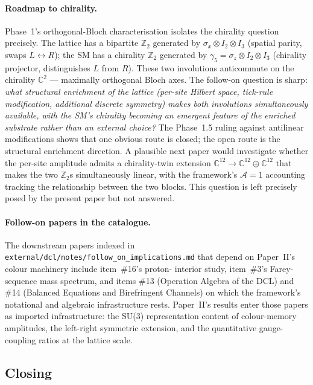 \paragraph{Roadmap to chirality.}  Phase~1's orthogonal-Bloch
characterisation isolates the chirality question precisely.  The
lattice has a bipartite $\mathbb{Z}_2$ generated by $\sigma_x
\otimes I_2 \otimes I_3$ (spatial parity, swaps $L \leftrightarrow
R$); the SM has a chirality $\mathbb{Z}_2$ generated by $\gamma_5
= \sigma_z \otimes I_2 \otimes I_3$ (chirality projector,
distinguishes $L$ from $R$).  These two involutions anticommute
on the chirality $\mathbb{C}^2$ --- maximally orthogonal Bloch
axes.  The follow-on question is sharp: \emph{what structural
enrichment of the lattice (per-site Hilbert space, tick-rule
modification, additional discrete symmetry) makes both
involutions simultaneously available, with the SM's chirality
becoming an emergent feature of the enriched substrate rather
than an external choice?}  The Phase~1.5 ruling against
antilinear modifications shows that one obvious route is closed;
the open route is the structural enrichment direction.  A
plausible next paper would investigate whether the per-site
amplitude admits a chirality-twin extension
$\mathbb{C}^{12} \to \mathbb{C}^{12} \oplus \mathbb{C}^{12}$ that
makes the two $\mathbb{Z}_2$s simultaneously linear, with the
framework's $\mathcal{A}=1$ accounting tracking the relationship
between the two blocks.  This question is left precisely posed
by the present paper but not answered.

\paragraph{Follow-on papers in the catalogue.}  The downstream
papers indexed in
\nolinkurl{external/dcl/notes/follow_on_implications.md} that depend
on Paper~II's colour machinery include item~\#16's proton-
interior study, item~\#3's Farey-sequence mass spectrum, and
items \#13 (Operation Algebra of the DCL) and \#14 (Balanced
Equations and Birefringent Channels) on which the framework's
notational and algebraic infrastructure rests.  Paper~II's
results enter those papers as imported infrastructure: the SU(3)
representation content of colour-memory amplitudes, the
left-right symmetric extension, and the quantitative
gauge-coupling ratios at the lattice scale.

\subsection{Closing}
\label{subsec:closing}

